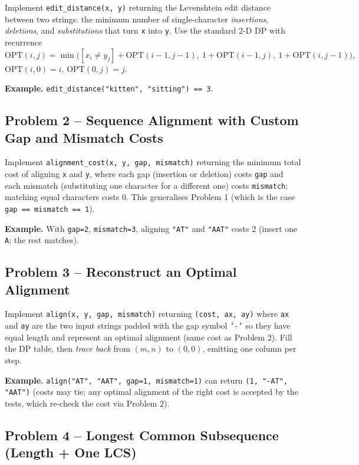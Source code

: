 \documentclass[11pt]{article}
\begin{document}
Implement \texttt{edit\_distance(x, y)} returning the Levenshtein edit distance between two
strings: the minimum number of single-character \emph{insertions}, \emph{deletions}, and
\emph{substitutions} that turn \texttt{x} into \texttt{y}. Use the standard 2-D DP with
recurrence
\[
\mathrm{OPT}(i,j) = \min\big( [x_i \ne y_j] + \mathrm{OPT}(i-1,j-1),\ 1 + \mathrm{OPT}(i-1,j),
\ 1 + \mathrm{OPT}(i,j-1)\big),
\]
$\mathrm{OPT}(i,0) = i$, $\mathrm{OPT}(0,j) = j$.

\textbf{Example.} \texttt{edit\_distance("kitten", "sitting") == 3}.

\subsection*{Problem 2 -- Sequence Alignment with Custom Gap and Mismatch Costs}

Implement \texttt{alignment\_cost(x, y, gap, mismatch)} returning the minimum total cost of
aligning \texttt{x} and \texttt{y}, where each gap (insertion or deletion) costs
\texttt{gap} and each mismatch (substituting one character for a different one) costs
\texttt{mismatch}; matching equal characters costs $0$. This generalises Problem 1 (which is
the case \texttt{gap == mismatch == 1}).

\textbf{Example.} With \texttt{gap=2}, \texttt{mismatch=3}, aligning \texttt{"AT"} and
\texttt{"AAT"} costs $2$ (insert one \texttt{A}; the rest matches).

\subsection*{Problem 3 -- Reconstruct an Optimal Alignment}

Implement \texttt{align(x, y, gap, mismatch)} returning \texttt{(cost, ax, ay)} where
\texttt{ax} and \texttt{ay} are the two input strings padded with the gap symbol
\texttt{'-'} so they have equal length and represent an optimal alignment (same cost as
Problem 2). Fill the DP table, then \emph{trace back} from $(m,n)$ to $(0,0)$, emitting one
column per step.

\textbf{Example.} \texttt{align("AT", "AAT", gap=1, mismatch=1)} can return
\texttt{(1, "-AT", "AAT")} (costs may tie; any optimal alignment of the right cost is
accepted by the tests, which re-check the cost via Problem 2).

\subsection*{Problem 4 -- Longest Common Subsequence (Length + One LCS)}
\end{document}
